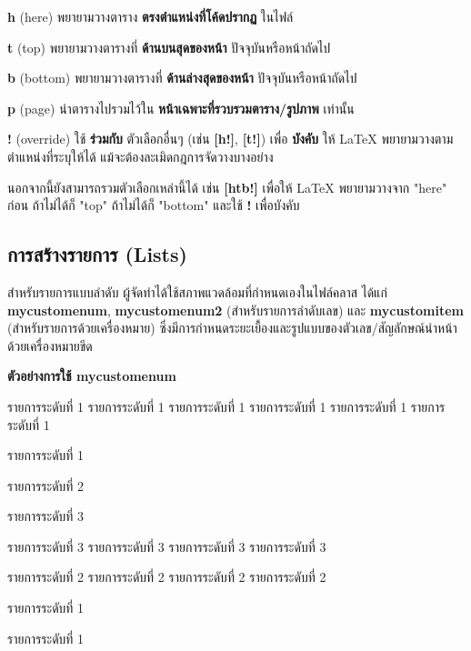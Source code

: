 \begin{mycustomitem}
    \item \textbf{h} (here) พยายามวางตาราง \textbf{ตรงตำแหน่งที่โค้ดปรากฏ} ในไฟล์
    \item \textbf{t} (top) พยายามวางตารางที่ \textbf{ด้านบนสุดของหน้า} ปัจจุบันหรือหน้าถัดไป
    \item \textbf{b} (bottom) พยายามวางตารางที่ \textbf{ด้านล่างสุดของหน้า} ปัจจุบันหรือหน้าถัดไป
    \item \textbf{p} (page) นำตารางไปรวมไว้ใน \textbf{หน้าเฉพาะที่รวบรวมตาราง/รูปภาพ} เท่านั้น
    \item \textbf{!} (override) ใช้ \textbf{ร่วมกับ} ตัวเลือกอื่นๆ (เช่น \textbf{[h!]}, \textbf{[t!]}) เพื่อ \textbf{บังคับ} ให้ LaTeX พยายามวางตามตำแหน่งที่ระบุให้ได้ แม้จะต้องละเมิดกฎการจัดวางบางอย่าง
\end{mycustomitem}

\hspace*{1.5em} %
นอกจากนี้ยังสามารถรวมตัวเลือกเหล่านี้ได้ เช่น \textbf{[htb!]} เพื่อให้ LaTeX พยายามวางจาก "here" ก่อน ถ้าไม่ได้ก็ "top" ถ้าไม่ได้ก็ "bottom" และใช้ \textbf{!} เพื่อบังคับ


\subsection{การสร้างรายการ (Lists)}
\hspace*{1.5em} %
สำหรับรายการแบบลำดับ ผู้จัดทำได้ใช้สภาพแวดล้อมที่กำหนดเองในไฟล์คลาส ได้แก่ \textbf{mycustomenum}, \textbf{mycustomenum2} (สำหรับรายการลำดับเลข) และ \textbf{mycustomitem} (สำหรับรายการด้วยเครื่องหมาย) ซึ่งมีการกำหนดระยะเยื้องและรูปแบบของตัวเลข/สัญลักษณ์นำหน้าด้วยเครื่องหมายขีด

\hspace*{1.5em} %
\textbf{ตัวอย่างการใช้ \textbf{mycustomenum}} 
\begin{mycustomenum}[label=1.1.\arabic*]
    \item รายการระดับที่ 1 รายการระดับที่ 1 รายการระดับที่ 1 รายการระดับที่ 1  รายการระดับที่ 1 รายการระดับที่ 1
    \item รายการระดับที่ 1
    \begin{mycustomenum}
        \item รายการระดับที่ 2
        \begin{mycustomenum}
            \item รายการระดับที่ 3
            \item รายการระดับที่ 3 รายการระดับที่ 3 รายการระดับที่ 3 รายการระดับที่ 3 
        \end{mycustomenum}
        \item รายการระดับที่ 2 รายการระดับที่ 2 รายการระดับที่ 2 รายการระดับที่ 2
    \end{mycustomenum}
    \item รายการระดับที่ 1
    \item รายการระดับที่ 1
\end{mycustomenum}

